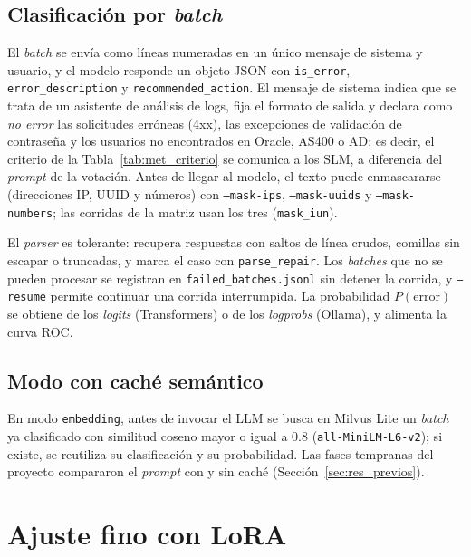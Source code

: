 \subsection{Clasificación por \textit{batch}}

El \textit{batch} se envía como líneas numeradas en un único mensaje de sistema y usuario, y el modelo responde un objeto JSON con \texttt{is\_error}, \texttt{error\_description} y \texttt{recommended\_action}. El mensaje de sistema indica que se trata de un asistente de análisis de logs, fija el formato de salida y declara como \emph{no error} las solicitudes erróneas (4xx), las excepciones de validación de contraseña y los usuarios no encontrados en Oracle, AS400 o AD; es decir, el criterio de la Tabla~\ref{tab:met_criterio} se comunica a los SLM, a diferencia del \textit{prompt} de la votación. Antes de llegar al modelo, el texto puede enmascararse (direcciones IP, UUID y números) con \texttt{--mask-ips}, \texttt{--mask-uuids} y \texttt{--mask-numbers}; las corridas de la matriz usan los tres (\texttt{mask\_iun}).

El \textit{parser} es tolerante: recupera respuestas con saltos de línea crudos, comillas sin escapar o truncadas, y marca el caso con \texttt{parse\_repair}. Los \textit{batches} que no se pueden procesar se registran en \texttt{failed\_batches.jsonl} sin detener la corrida, y \texttt{--resume} permite continuar una corrida interrumpida. La probabilidad $P(\text{error})$ se obtiene de los \textit{logits} (Transformers) o de los \textit{logprobs} (Ollama), y alimenta la curva ROC.

\subsection{Modo con caché semántico}

En modo \texttt{embedding}, antes de invocar el LLM se busca en Milvus Lite un \textit{batch} ya clasificado con similitud coseno mayor o igual a 0.8 (\texttt{all-MiniLM-L6-v2}); si existe, se reutiliza su clasificación y su probabilidad. Las fases tempranas del proyecto compararon el \textit{prompt} con y sin caché (Sección~\ref{sec:res_previos}).

\section{Ajuste fino con LoRA}\label{sec:met_finetuning}

